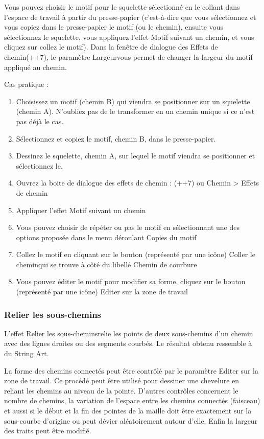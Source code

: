 \documentclass[a4paper,twoside]{article}
\begin{document}
Vous pouvez choisir le motif pour le squelette sélectionné en le collant dans l'espace de travail à partir du presse-papier (c'est-à-dire que vous sélectionnez et vous copiez dans le presse-papier le motif (ou le chemin), ensuite vous sélectionnez le squelette, vous appliquez l'effet \og Motif suivant un chemin\fg, et vous cliquez sur \og collez le motif\fg). Dans la fenêtre de dialogue des \og Effets de chemin\fg  (++7), le paramètre \og Largeur\fg  vous permet de changer la largeur du motif appliqué au chemin.

Cas pratique :
\begin{enumerate}
\item Choisissez un motif (chemin B) qui viendra se positionner sur un squelette (chemin A). N'oubliez pas de le transformer en un chemin unique si ce n'est pas déjà le cas.
\item Sélectionnez et copiez le motif, chemin B, dans le presse-papier.
\item Dessinez le squelette, chemin A, sur lequel le motif viendra se positionner et sélectionnez le.
\item Ouvrez la boite de dialogue des effets de chemin : (++7) ou Chemin > Effets de chemin
\item Appliquer l'effet \og Motif suivant un chemin\fg
\item Vous pouvez choisir de répéter ou pas le motif en sélectionnant une des options proposée dans le menu déroulant \og Copies du motif\fg
\item Collez le motif en cliquant sur le bouton (représenté par une icône) \og Coller le chemin\fg  qui se trouve à côté du libellé \og Chemin de courbure\fg
\item Vous pouvez éditer le motif pour modifier sa forme, cliquez sur le bouton (représenté par une icône) \og Editer sur la zone de travail\fg
\end{enumerate}

\subsubsection{Relier les sous-chemins}


L'effet \og Relier les sous-chemins\fg  relie les points de deux sous-chemins d'un chemin avec des lignes droites ou des segments courbés. Le résultat obtenu ressemble à du \og String Art\fg.

La forme des chemins connectés peut être contrôlé par le paramètre \og Editer sur la zone de travail\fg . Ce procédé peut être utilisé pour dessiner une chevelure en reliant les chemins au niveau de la pointe. D'autres contrôles concernent le nombre de chemins, la variation de l'espace entre les chemins connectés (faisceau) et aussi si le début et la fin des pointes de la maille doit être exactement sur la sous-courbe d'origine ou peut dévier aléatoirement autour d'elle. Enfin la largeur des traits peut être modifié.
\end{document}
